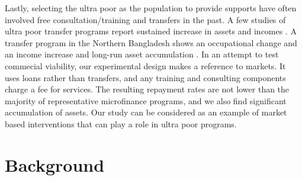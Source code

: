	Lastly, selecting the ultra poor as the population to provide supports have often involved free consultation/training and transfers in the past. A few studies of ultra poor transfer programs report sustained increase in assets and incomes \citep{Blattman2014, BanerjeeetalScience2015, Blattmanetal2016, HaushoferShapiro2016}. A transfer program in the Northern Bangladesh shows an occupational change and an income increase \citep{BandieraBRAC2017} and long-run asset accumulation \citep{Balboni2020}. %
	In an attempt to test commecial viability, our experimental design makes a reference to markets. It uses loans rather than transfers, and any training and consulting components charge a fee for services. The resulting repayment rates are not lower than the majority of representative microfinance programs, and we also find significant accumulation of assets. Our study can be considered as an example of market based interventions that can play a role in ultra poor programs.


\section{Background}
\label{SecBackground}



